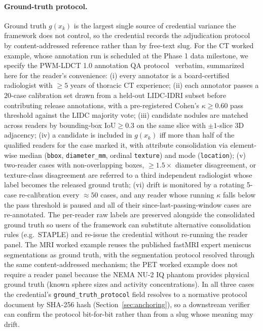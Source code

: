 \documentclass[twoside,11pt]{article}
\begin{document}
\paragraph{Ground-truth protocol.} Ground truth $g(x_k)$ is the largest single source of credential variance the framework does not control, so the credential records the adjudication protocol by content-addressed reference rather than by free-text slug. For the CT worked example, whose annotation run is scheduled at the Phase 1 data milestone, we specify the PWM-LDCT 1.0 annotation QA protocol~\citep{ws1dataset} verbatim, summarized here for the reader's convenience: (i) every annotator is a board-certified radiologist with $\geq 5$ years of thoracic CT experience; (ii) each annotator passes a $20$-case calibration set drawn from a held-out LIDC-IDRI subset before contributing release annotations, with a pre-registered Cohen's $\kappa \geq 0.60$ pass threshold against the LIDC majority vote; (iii) candidate nodules are matched across readers by bounding-box $\mathrm{IoU} \geq 0.3$ on the same slice with $\pm 1$-slice 3D adjacency; (iv) a candidate is included in $g(x_k)$ iff more than half of the qualified readers for the case marked it, with attribute consolidation via element-wise median (\texttt{bbox}, \texttt{diameter\_mm}, ordinal \texttt{texture}) and mode (\texttt{location}); (v) two-reader cases with non-overlapping boxes, $\geq 1.5\times$ diameter disagreement, or texture-class disagreement are referred to a third independent radiologist whose label becomes the released ground truth; (vi) drift is monitored by a rotating 5-case re-calibration every $\approx 50$ cases, and any reader whose running $\kappa$ falls below the pass threshold is paused and all of their since-last-passing-window cases are re-annotated. The per-reader raw labels are preserved alongside the consolidated ground truth so users of the framework can substitute alternative consolidation rules (e.g.\ STAPLE) and re-issue the credential without re-running the reader panel. The MRI worked example reuses the published fastMRI expert meniscus segmentations as ground truth, with the segmentation protocol resolved through the same content-addressed mechanism; the PET worked example does not require a reader panel because the NEMA NU-2 IQ phantom provides physical ground truth (known sphere sizes and activity concentrations). In all three cases the credential's \texttt{ground\_truth\_protocol} field resolves to a normative protocol document by SHA-256 hash (Section~\ref{sec:anchoring}), so a downstream verifier can confirm the protocol bit-for-bit rather than from a slug whose meaning may drift.
\end{document}
